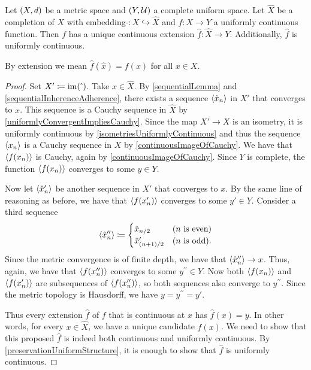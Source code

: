 \begin{proposition} \label{uniformlyContinuousExtensionToCompletion}
Let $\sSet{X,d}$ be a metric space and $\sSet{Y,\mathcal{U}}$ a complete uniform space. Let $\hat{X}$ be a completion of $X$ with embedding $\hat{}: X\hookrightarrow \hat{X}$ and $f: X\to Y$ a uniformly continuous function. Then $f$ has a unique continuous extension $\hat{f}: \hat{X} \to Y$. Additionally, $\hat{f}$ is uniformly continuous.
\end{proposition}
By extension we mean $\hat{f}(\hat{x}) = f(x)$ for all $x\in X$.
\begin{proof}
Set $X'\coloneqq \operatorname{im}(\,\hat{}\,)$.
Take $x\in \hat{X}$. By \ref{sequentialLemma} and \ref{sequentialInherenceAdherence}, there exists a sequence $\left\langle \hat{x}_n \right\rangle$ in $X'$ that converges to $x$. This sequence is a Cauchy sequence in $\hat{X}$ by \ref{uniformlyConvergentImpliesCauchy}. Since the map $X'\to X$ is an isometry, it is uniformly continuous by \ref{isometriesUniformlyContinuous} and thus the sequence $\left\langle x_n \right\rangle$ is a Cauchy sequence in $X$ by \ref{continuousImageOfCauchy}. We have that $\left\langle f(x_n) \right\rangle$ is Cauchy, again by \ref{continuousImageOfCauchy}. Since $Y$ is complete, the function $\left\langle f(x_n) \right\rangle$ converges to some $y\in Y$.

Now let $\left\langle \hat{x}'_n \right\rangle$ be another sequence in $X'$ that converges to $x$. By the same line of reasoning as before, we have that $\left\langle f(x_n') \right\rangle$ converges to some $y'\in Y$.
Consider a third sequence
\[ \left\langle \hat{x}_n^{\prime\prime} \right\rangle \coloneqq \begin{cases}
\hat{x}_{n/2} & (\text{$n$ is even}) \\ \hat{x}'_{(n+1)/2} & (\text{$n$ is odd}).
\end{cases} \]
Since the metric convergence is of finite depth, we have that $\left\langle \hat{x}_n^{\prime\prime} \right\rangle \to x$. Thus, again, we have that $\left\langle f(x_n^{\prime\prime}) \right\rangle$ converges to some $y^{\prime\prime}\in Y$. Now both $\left\langle f(x_n) \right\rangle$ and $\left\langle f(x_n') \right\rangle$ are subsequences of $\left\langle f(x_n^{\prime\prime}) \right\rangle$, so both sequences also converge to $y^{\prime\prime}$. Since the metric topology is Hausdorff, we have $y = y^{\prime\prime} = y'$.

Thus every extension $\hat{f}$ of $f$ that is continuous at $x$ has $\hat{f}(x) = y$. In other words, for every $x\in \hat{X}$, we have a unique candidate $\hat{f}(x)$. We need to show that this proposed $\hat{f}$ is indeed both continuous and uniformly continuous. By \ref{preservationUniformStructure}, it is enough to show that $\hat{f}$ is uniformly continuous.


\end{proof}
